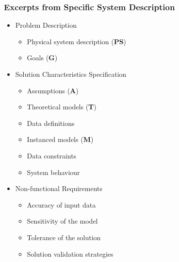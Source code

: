\documentclass[t,12pt,numbers,fleqn]{beamer}
\begin{document}

\begin{frame}
\frametitle{Excerpts from Specific System Description}

\begin{itemize}

\item Problem Description
\begin{itemize}
\item Physical system description (\textbf{PS}) 
\item Goals (\textbf{G})
\end{itemize}
 
\item Solution Characteristics Specification
\begin{itemize}
\item Assumptions (\textbf{A})
\item Theoretical models (\textbf{T})
\item Data definitions
\item Instanced models (\textbf{M})
\item Data constraints
\item System behaviour
\end{itemize}

\item Non-functional Requirements
\begin{itemize}
\item Accuracy of input data
\item Sensitivity of the model
\item Tolerance of the solution
\item Solution validation strategies
\end{itemize}

\end{itemize}

\end{frame}

\end{document}
